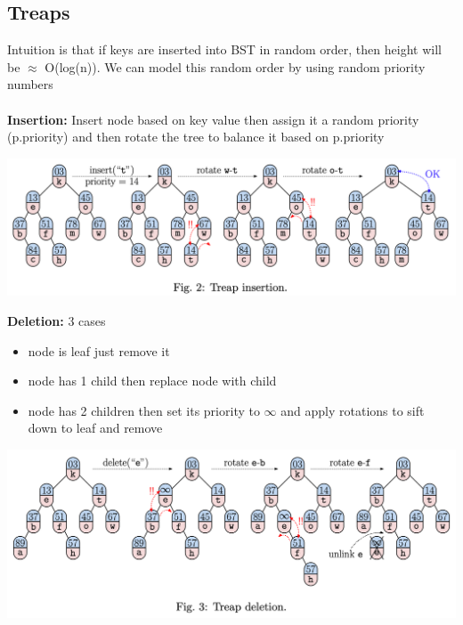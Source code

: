 \documentclass{article}
\begin{document}
  \subsection{Treaps}
  Intuition is that if keys are inserted into BST in random order, then height will be $\approx$ O(log(n)). We can model this random order by using random priority numbers\\ \\
  \textbf{Insertion: }Insert node based on key value then assign it a random priority (p.priority) and then rotate the tree to balance it based on p.priority
  \begin{center}
  \includegraphics[scale=0.2]{TreapInsertion}
  \end{center}
  \textbf{Deletion: }3 cases
  \begin{itemize}[noitemsep]
  \item node is leaf just remove it
  \item node has 1 child then replace node with child
  \item node has 2 children then set its priority to $\infty$ and apply rotations to sift down to leaf and remove
  \end{itemize}
  \begin{center}
  \includegraphics[scale=0.2]{TreapDeletion}
  \end{center}
\end{document}
